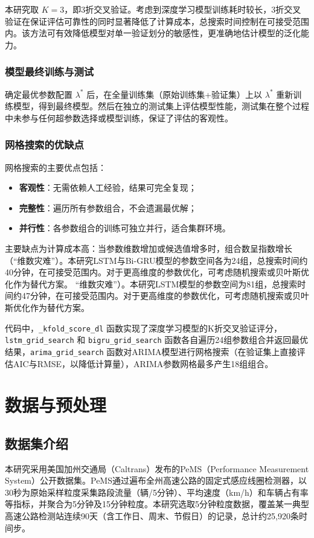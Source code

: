 \documentclass[12pt,a4paper,oneside]{ctexbook}
\begin{document}
	本研究取 $K=3$，即3折交叉验证。考虑到深度学习模型训练耗时较长，3折交叉验证在保证评估可靠性的同时显著降低了计算成本，总搜索时间控制在可接受范围内。该方法可有效降低模型对单一验证划分的敏感性，更准确地估计模型的泛化能力。
	
	\subsection{模型最终训练与测试}
	
	确定最优参数配置 $\lambda^*$ 后，在全量训练集（原始训练集+验证集）上以 $\lambda^*$ 重新训练模型，得到最终模型。然后在独立的测试集上评估模型性能，测试集在整个过程中未参与任何超参数选择或模型训练，保证了评估的客观性。
	
	\subsection{网格搜索的优缺点}
	
	网格搜索的主要优点包括：
	\begin{itemize}
		\item \textbf{客观性}：无需依赖人工经验，结果可完全复现；
		\item \textbf{完整性}：遍历所有参数组合，不会遗漏最优解；
		\item \textbf{并行性}：各参数组合的训练可独立并行，适合集群环境。
	\end{itemize}
	
	主要缺点为计算成本高：当参数维数增加或候选值增多时，组合数呈指数增长（``维数灾难''）。本研究LSTM与Bi-GRU模型的参数空间各为24组，总搜索时间约40分钟，在可接受范围内。对于更高维度的参数优化，可考虑随机搜索或贝叶斯优化作为替代方案。
	“维数灾难”）。本研究LSTM模型的参数空间为81组，总搜索时间约47分钟，在可接受范围内。对于更高维度的参数优化，可考虑随机搜索或贝叶斯优化作为替代方案。
	
	代码中，\texttt{\_kfold\_score\_dl} 函数实现了深度学习模型的K折交叉验证评分，\texttt{lstm\_grid\_search} 和 \texttt{bigru\_grid\_search} 函数各自遍历24组参数组合并返回最优结果，\texttt{arima\_grid\_search} 函数对ARIMA模型进行网格搜索（在验证集上直接评估AIC与RMSE，以降低计算量），ARIMA参数网格最多产生18组组合。
	
	\chapter{数据与预处理}
	
	\section{数据集介绍}
	本研究采用美国加州交通局（Caltrans）发布的PeMS（Performance Measurement System）公开数据集\cite{pems2025}。PeMS通过遍布全州高速公路的固定式感应线圈检测器，以30秒为原始采样粒度采集路段流量（辆/5分钟）、平均速度（km/h）和车辆占有率等指标，并聚合为5分钟及15分钟粒度。本研究选取5分钟粒度数据，覆盖某一典型高速公路检测站连续90天（含工作日、周末、节假日）的记录，总计约25,920条时间步。
	
\end{document}
